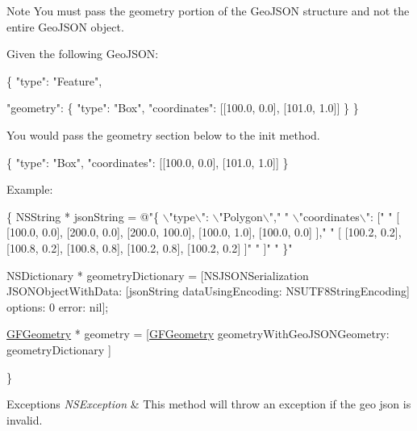 \begin{DoxyNote}{Note}
You must pass the geometry portion of the Geo\+J\+S\+O\+N structure and not the entire Geo\+J\+S\+O\+N object. 

Given the following Geo\+J\+S\+O\+N\+: 
\begin{DoxyCode}
\{
      \textcolor{stringliteral}{"type"}: \textcolor{stringliteral}{"Feature"},

      \textcolor{stringliteral}{"geometry"}:  \{
          \textcolor{stringliteral}{"type"}: \textcolor{stringliteral}{"Box"},
          \textcolor{stringliteral}{"coordinates"}: [[100.0, 0.0], [101.0, 1.0]]
      \}
 \}
\end{DoxyCode}


You would pass the geometry section below to the init method. 
\begin{DoxyCode}
\{
    \textcolor{stringliteral}{"type"}: \textcolor{stringliteral}{"Box"},
    \textcolor{stringliteral}{"coordinates"}: [[100.0, 0.0], [101.0, 1.0]]
\}
\end{DoxyCode}
 
\end{DoxyNote}


Example\+: 
\begin{DoxyCode}
\{
    NSString * jsonString = \textcolor{stringliteral}{@"\{ \(\backslash\)"}type\(\backslash\)\textcolor{stringliteral}{": \(\backslash\)"Polygon\(\backslash\)","}
                             \textcolor{stringliteral}{"    \(\backslash\)"coordinates\(\backslash\)": ["}
                             \textcolor{stringliteral}{"      [ [100.0, 0.0], [200.0, 0.0], [200.0, 100.0], [100.0, 1.0], [100.0,
       0.0] ],"}
                             \textcolor{stringliteral}{"      [ [100.2, 0.2], [100.8, 0.2], [100.8, 0.8], [100.2, 0.8], [100.2, 0.2]
       ]"}
                             \textcolor{stringliteral}{"      ]"}
                             \textcolor{stringliteral}{"   \}"}

    NSDictionary * geometryDictionary = [NSJSONSerialization JSONObjectWithData: [jsonString 
      dataUsingEncoding: NSUTF8StringEncoding] options: 0 error: nil];

    \hyperlink{interface_g_f_geometry}{GFGeometry} * geometry = [\hyperlink{interface_g_f_geometry}{GFGeometry} geometryWithGeoJSONGeometry: geometryDictionary
       ]

\}
\end{DoxyCode}



\begin{DoxyExceptions}{Exceptions}
{\em N\+S\+Exception} & This method will throw an exception if the geo json is invalid. \\
\hline
\end{DoxyExceptions}


